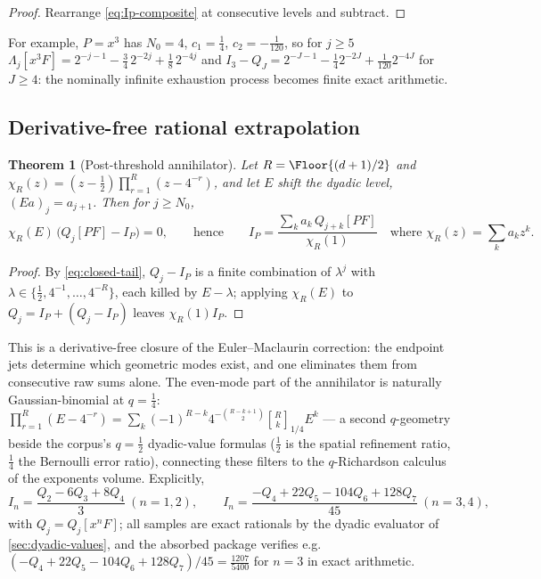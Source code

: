 \documentclass[11pt,oneside]{article}
\numberwithin{equation}{section}
\newtheorem{theorem}{Theorem}[section]
\theoremstyle{definition}
\theoremstyle{remark}
\begin{document}
\begin{proof}
Rearrange \eqref{eq:Ip-composite} at consecutive levels and subtract.
\end{proof}

For example, $P=x^{3}$ has $N_0=4$, $c_1=\tfrac14$,
$c_2=-\tfrac1{120}$, so for $j\ge5$
$\Lambda_j[x^{3}F]=2^{-j-1}-\tfrac34\,2^{-2j}+\tfrac18\,2^{-4j}$ and
$I_3-Q_J=2^{-J-1}-\tfrac14 2^{-2J}+\tfrac1{120}2^{-4J}$ for
$J\ge4$: the nominally infinite exhaustion process becomes finite
exact arithmetic.

\subsection{Derivative-free rational extrapolation}

\begin{theorem}[Post-threshold annihilator]
\label{thm:annihilator-comb}
Let $R=\Floor{(d+1)/2}$ and
$\chi_R(z)=(z-\tfrac12)\prod_{r=1}^{R}(z-4^{-r})$, and let $E$ shift
the dyadic level, $(Ea)_j=a_{j+1}$.  Then for $j\ge N_0$,
\begin{equation}
 \chi_R(E)\,\bigl(Q_j[PF]-I_P\bigr)=0,
 \qquad\text{hence}\qquad
 I_P=\frac{\sum_{k}a_k\,Q_{j+k}[PF]}{\chi_R(1)}
 \quad\text{where }\chi_R(z)=\sum_ka_kz^{k}.
 \label{eq:annihilator}
\end{equation}
\end{theorem}

\begin{proof}
By \eqref{eq:closed-tail}, $Q_j-I_P$ is a finite combination of
$\lambda^{j}$ with
$\lambda\in\{\tfrac12,4^{-1},\ldots,4^{-R}\}$, each killed by
$E-\lambda$; applying $\chi_R(E)$ to $Q_j=I_P+(Q_j-I_P)$ leaves
$\chi_R(1)I_P$.
\end{proof}

This is a derivative-free closure of the Euler--Maclaurin correction:
the endpoint jets determine which geometric modes exist, and one
eliminates them from consecutive raw sums alone.  The even-mode part
of the annihilator is naturally Gaussian-binomial at $q=\tfrac14$:
$\prod_{r=1}^{R}(E-4^{-r})
=\sum_{k}(-1)^{R-k}4^{-\binom{R-k+1}2}
\genfrac{[}{]}{0pt}{}{R}{k}_{1/4}E^{k}$ --- a second $q$-geometry
beside the corpus's $q=\tfrac12$ dyadic-value formulas ($\tfrac12$ is
the spatial refinement ratio, $\tfrac14$ the Bernoulli error ratio),
connecting these filters to the $q$-Richardson calculus of the
exponents volume.  Explicitly,
\begin{equation}
 I_n=\frac{Q_2-6Q_3+8Q_4}{3}\ (n=1,2),
 \qquad
 I_n=\frac{-Q_4+22Q_5-104Q_6+128Q_7}{45}\ (n=3,4),
 \label{eq:richardson-explicit}
\end{equation}
with $Q_j=Q_j[x^{n}F]$; all samples are exact rationals by the dyadic
evaluator of \cref{sec:dyadic-values}, and the absorbed package
verifies e.g.\ $(-Q_4+22Q_5-104Q_6+128Q_7)/45=\tfrac{1207}{5400}$ for
$n=3$ in exact arithmetic.
\end{document}
